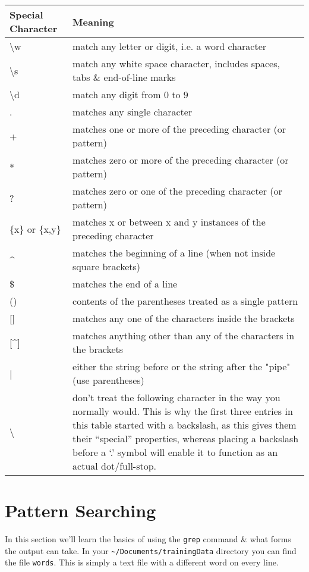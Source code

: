 \begin{center}
\renewcommand{\arraystretch}{1.6}
\begin{tabular}{|p{4cm} | p{} |}
\hline
Special Character & Meaning \\ \hline
\textbackslash w & match any letter or digit, i.e. a word character \\
\textbackslash s & match any white space character, includes spaces,
tabs \& end-of-line marks \\
\textbackslash d & match any digit from 0 to 9 \\
. & matches any single character \\
+ & matches one or more of the preceding character (or pattern) \\
\** & matches zero or more of the preceding character (or pattern) \\
? & matches zero or one of the preceding character (or pattern) \\
\{x\} or \{x,y\} & matches x or between x and y instances of the preceding
character \\
\^{} & matches the beginning of a line (when not inside square brackets) \\
\$ & matches the end of a line \\
() & contents of the parentheses treated as a single pattern \\
{[}] & matches any one of the characters inside the brackets \\
{[}\^{}] & matches anything other than any of the characters in the brackets \\
| & either the string before or the string after the "pipe" (use
parentheses) \\
\textbackslash & don't treat the following character in the way you normally would. This is why the first three entries in this table started with a backslash, as this gives them their ``special'' properties, whereas placing a backslash before a `.' symbol will enable it to function as an actual dot/full-stop. \\
\hline
\end{tabular}
\end{center}

\section{Pattern Searching}
In this section we'll learn the basics of using the \texttt{grep} command \& what forms the output can take.
In your \texttt{\~{}/Documents/trainingData} directory you can find the file \texttt{words}.
This is simply a text file with a different word on every line. \\

